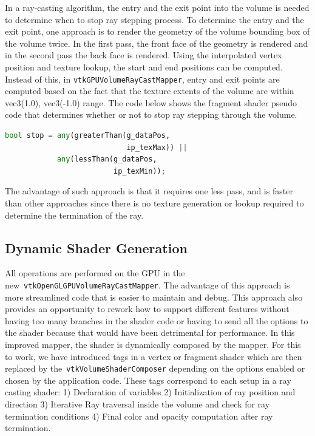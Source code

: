 
In a ray-casting algorithm, the entry and the exit point into the volume is
needed to determine when to stop ray stepping process. To determine the entry and
the exit point, one approach is to render the geometry of the volume bounding
box of the volume twice. In the first pass, the front face of the geometry is
rendered and in the second pass the back face is rendered.
Using the interpolated vertex position and
texture lookup, the start and end positions can be computed. Instead of this, in
\texttt{vtkGPUVolumeRayCastMapper}, entry and exit points are computed based on
the fact that the texture extents of the volume are within vec3(1.0), vec3(-1.0)
range.%
The code below shows the
fragment shader pseudo code that determines whether or not to stop ray stepping
through the volume.

\begin{center}
  \begin{lstlisting}[language=Python, caption={Ray stop determination},
                     captionpos=b, frame=single, breaklines=true]
bool stop = any(greaterThan(g_dataPos,
                            ip_texMax)) ||
            any(lessThan(g_dataPos,
                         ip_texMin));
  \end{lstlisting}
\end{center}

The advantage of such approach is that it requires one less pass, and is faster
than other approaches since there is no texture generation or lookup required
to determine the termination of the ray.


\subsection{Dynamic Shader Generation}
All operations are performed on the GPU in the
new~\texttt{vtkOpenGLGPUVolumeRayCastMapper}. The advantage of this approach is
more streamlined code that is easier to maintain and debug. This approach also
provides an opportunity to rework how to support different features without
having too many branches in the shader code or having to send all the options to
the shader because that would have been detrimental for performance. In this
improved mapper, the shader is dynamically composed by the mapper. For this to
work, we have introduced tags in a vertex or fragment shader which are then
replaced by the~\texttt{vtkVolumeShaderComposer} depending on the options
enabled or chosen by the application code. These tags correspond to each setup
in a ray casting shader: 1) Declaration of variables 2) Initialization of ray
position and direction 3) Iterative Ray traversal inside the volume and check
for ray termination conditions 4) Final color and opacity computation after ray
termination.%

